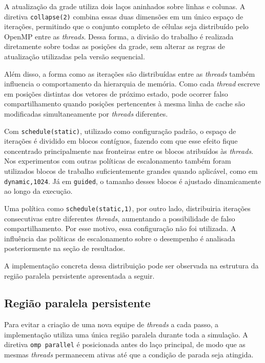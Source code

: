 \documentclass[11pt,a4paper]{article}
\begin{document}
A atualização da grade utiliza dois laços aninhados sobre linhas e colunas. A diretiva \texttt{collapse(2)} combina essas duas dimensões em um único espaço de iterações, permitindo que o conjunto completo de células seja distribuído pelo OpenMP entre as \emph{threads}. Dessa forma, a divisão do trabalho é realizada diretamente sobre todas as posições da grade, sem alterar as regras de atualização utilizadas pela versão sequencial. 

Além disso, a forma como as iterações são distribuídas entre as \emph{threads} também influencia o comportamento da hierarquia de memória. Como cada \emph{thread} escreve em posições distintas dos vetores de próximo estado, pode ocorrer falso compartilhamento quando posições pertencentes à mesma linha de cache são modificadas simultaneamente por \emph{threads} diferentes. 

Com \texttt{schedule(static)}, utilizado como configuração padrão, o espaço de iterações é dividido em blocos contíguos, fazendo com que esse efeito fique concentrado principalmente nas fronteiras entre os blocos atribuídos às \emph{threads}. Nos experimentos com outras políticas de escalonamento também foram utilizados blocos de trabalho suficientemente grandes quando aplicável, como em \texttt{dynamic,1024}. Já em \texttt{guided}, o tamanho desses blocos é ajustado dinamicamente ao longo da execução.

Uma política como \texttt{schedule(static,1)}, por outro lado, distribuiria iterações consecutivas entre diferentes \emph{threads}, aumentando a possibilidade de falso compartilhamento. Por esse motivo, essa configuração não foi utilizada. A influência das políticas de escalonamento sobre o desempenho é analisada posteriormente na seção de resultados.

A implementação concreta dessa distribuição pode ser observada na estrutura da região paralela persistente apresentada a seguir.

\subsection{Região paralela persistente}

Para evitar a criação de uma nova equipe de \emph{threads} a cada passo, a implementação utiliza uma única região paralela durante toda a simulação. A diretiva \texttt{omp parallel} é posicionada antes do laço principal, de modo que as mesmas \emph{threads} permanecem ativas até que a condição de parada seja atingida.
\end{document}
